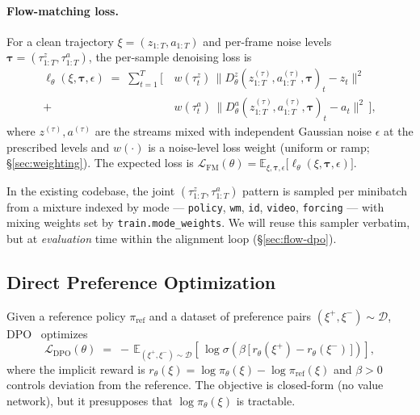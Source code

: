 \documentclass[11pt]{article}
\newcommand{\Dtheta}{D_\theta}
\begin{document}
\paragraph{Flow-matching loss.}
For a clean trajectory $\xi = (z_{1:T}, a_{1:T})$ and per-frame noise levels $\boldsymbol{\tau} = (\tau^z_{1:T}, \tau^a_{1:T})$, the per-sample denoising loss is
\begin{align}
    \ell_\theta(\xi, \boldsymbol{\tau}, \epsilon)
    \;=\; \sum_{t=1}^{T} \Big[\,
        & w(\tau^z_t)\,\big\| \Dtheta^z(z^{(\tau)}_{1:T}, a^{(\tau)}_{1:T}, \boldsymbol{\tau})_t - z_t \big\|^2 \nonumber \\
        + \;& w(\tau^a_t)\,\big\| \Dtheta^a(z^{(\tau)}_{1:T}, a^{(\tau)}_{1:T}, \boldsymbol{\tau})_t - a_t \big\|^2
    \,\Big],
    \label{eq:fm-loss-per-sample}
\end{align}
where $z^{(\tau)}, a^{(\tau)}$ are the streams mixed with independent Gaussian noise $\epsilon$ at the prescribed levels and $w(\cdot)$ is a noise-level loss weight (uniform or ramp; \S\ref{sec:weighting}). The expected loss is
$\mathcal{L}_{\mathrm{FM}}(\theta) = \mathbb{E}_{\xi, \boldsymbol{\tau}, \epsilon}\big[\ell_\theta(\xi, \boldsymbol{\tau}, \epsilon)\big].$

In the existing codebase, the joint $(\tau^z_{1:T}, \tau^a_{1:T})$ pattern is sampled per minibatch from a mixture indexed by mode --- \texttt{policy}, \texttt{wm}, \texttt{id}, \texttt{video}, \texttt{forcing} --- with mixing weights set by \texttt{train.mode\_weights}. We will reuse this sampler verbatim, but at \emph{evaluation} time within the alignment loop (\S\ref{sec:flow-dpo}).

\subsection{Direct Preference Optimization}
\label{sec:bg-dpo}

Given a reference policy $\pi_{\mathrm{ref}}$ and a dataset of preference pairs $(\xi^+, \xi^-) \sim \mathcal{D}$, DPO~\cite{rafailov2023direct} optimizes
\begin{equation}
    \mathcal{L}_{\mathrm{DPO}}(\theta)
    \;=\; -\,\mathbb{E}_{(\xi^+, \xi^-) \sim \mathcal{D}} \left[\,
        \log \sigma\!\left(\beta\,\big[\,r_\theta(\xi^+) - r_\theta(\xi^-)\,\big]\right)
    \right],
    \label{eq:dpo-base}
\end{equation}
where the implicit reward is $r_\theta(\xi) = \log \pi_\theta(\xi) - \log \pi_{\mathrm{ref}}(\xi)$ and $\beta > 0$ controls deviation from the reference. The objective is closed-form (no value network), but it presupposes that $\log \pi_\theta(\xi)$ is tractable.
\end{document}
